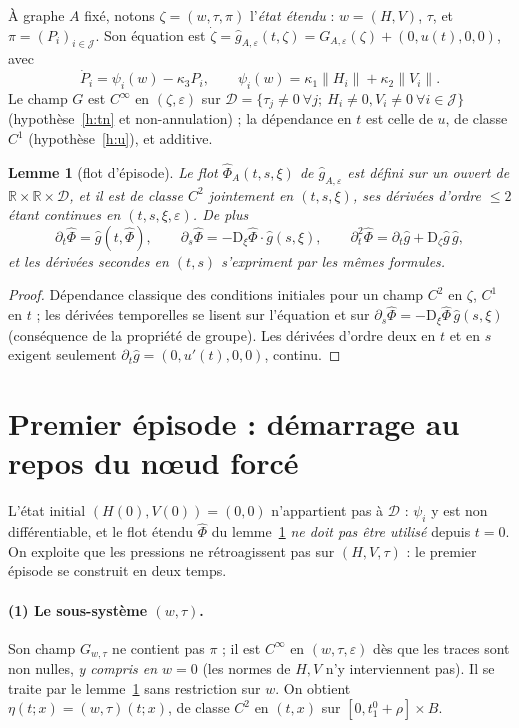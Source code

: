 \documentclass[11pt,a4paper]{article}
\newtheorem{lemme}[theoreme]{Lemme}
\theoremstyle{remark}
\theoremstyle{definition}
\newcommand{\R}{\mathbb R}
\newcommand{\norm}[1]{\lVert #1\rVert}
\newcommand{\eps}{\varepsilon}
\newcommand{\D}{\mathrm D}
\begin{document}
À graphe $A$ fixé, notons $\zeta=(w,\tau,\pi)$ l'\emph{état étendu} : $w=(H,V)$, $\tau$, et $\pi=(P_i)_{i\in\mathcal J}$. Son équation est $\dot\zeta=\hat g_{A,\eps}(t,\zeta)=G_{A,\eps}(\zeta)+(0,u(t),0,0)$, avec
\[
\dot P_i=\psi_i(w)-\kappa_3P_i,\qquad \psi_i(w)=\kappa_1\norm{H_i}+\kappa_2\norm{V_i}.
\]
Le champ $G$ est $C^\infty$ en $(\zeta,\eps)$ sur $\mathcal D=\{\tau_j\ne0\ \forall j;\ H_i\ne0,V_i\ne0\ \forall i\in\mathcal J\}$ (hypothèse~\ref{h:tn} et non-annulation) ; la dépendance en $t$ est celle de $u$, de classe $C^1$ (hypothèse~\ref{h:u}), et additive.

\begin{lemme}[flot d'épisode]\label{lem:flot}
Le flot $\hat\Phi_A(t,s,\xi)$ de $\hat g_{A,\eps}$ est défini sur un ouvert de $\R\times\R\times\mathcal D$, et il est de classe $C^2$ jointement en $(t,s,\xi)$, ses dérivées d'ordre $\le2$ étant continues en $(t,s,\xi,\eps)$. De plus
\[
\partial_t\hat\Phi=\hat g(t,\hat\Phi),\qquad
\partial_s\hat\Phi=-\D_\xi\hat\Phi\cdot\hat g(s,\xi),\qquad
\partial^2_t\hat\Phi=\partial_t\hat g+\D_\zeta\hat g\,\hat g,
\]
et les dérivées secondes en $(t,s)$ s'expriment par les mêmes formules.
\end{lemme}
\begin{proof}
Dépendance classique des conditions initiales pour un champ $C^2$ en $\zeta$, $C^1$ en $t$ ; les dérivées temporelles se lisent sur l'équation et sur $\partial_s\hat\Phi=-\D_\xi\hat\Phi\,\hat g(s,\xi)$ (conséquence de la propriété de groupe). Les dérivées d'ordre deux en $t$ et en $s$ exigent seulement $\partial_t\hat g=(0,u'(t),0,0)$, continu.
\end{proof}

\section{Premier épisode : démarrage au repos du n\oe ud forcé}

L'état initial $(H(0),V(0))=(0,0)$ n'appartient pas à $\mathcal D$ : $\psi_i$ y est non différentiable, et le flot étendu $\hat\Phi$ du lemme~\ref{lem:flot} \emph{ne doit pas être utilisé} depuis $t=0$. On exploite que les pressions ne rétroagissent pas sur $(H,V,\tau)$ : le premier épisode se construit en deux temps.

\paragraph{(1) Le sous-système $(w,\tau)$.} Son champ $G_{w,\tau}$ ne contient pas $\pi$ ; il est $C^\infty$ en $(w,\tau,\eps)$ dès que les traces sont non nulles, \emph{y compris en $w=0$} (les normes de $H,V$ n'y interviennent pas). Il se traite par le lemme~\ref{lem:flot} sans restriction sur $w$. On obtient $\eta(t;x)=(w,\tau)(t;x)$, de classe $C^2$ en $(t,x)$ sur $[0,t_1^0+\rho]\times B$.
\end{document}
